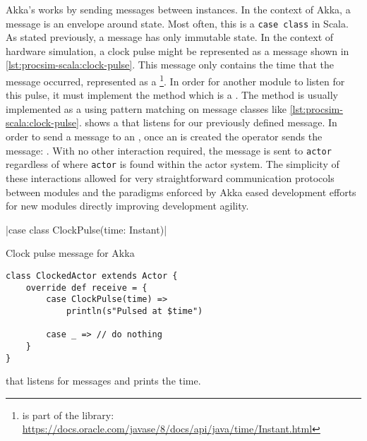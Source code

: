Akka's \akkaActor{} works by sending messages between \akkaActor{} instances. In the context of Akka, a message is an envelope around state. Most often, this is a \texttt{case class} in Scala. As stated previously, a message has only immutable state. In the context of hardware simulation, a clock pulse might be represented as a message shown in \cref{lst:procsim-scala:clock-pulse}. This message only contains the time that the message occurred, represented as a \footnote{ is part of the  library: \url{https://docs.oracle.com/javase/8/docs/api/java/time/Instant.html}{}}. In order for another module to listen for this pulse, it must implement the  method which is a . The  method is usually implemented as a  using pattern matching \cite{Scala-PatternMatching} on message classes like \cref{lst:procsim-scala:clock-pulse}.  shows a \akkaActor{} that listens for our previously defined  message. In order to send a message to an \akkaActor{}, once an \akkaActor{} is created the \scalainline{!} operator sends the message: . With no other interaction required, the message is sent to \texttt{actor} regardless of where \texttt{actor} is found within the actor system. The simplicity of these interactions allowed for very straightforward communication protocols between modules and the paradigms enforced by Akka eased development efforts for new modules directly improving development agility.

\begin{listing}[b!]
    |case class ClockPulse(time: Instant)|
    \caption{Clock pulse message for Akka}
    \label{lst:procsim-scala:clock-pulse}
\end{listing}

\begin{listing}[t!]
\begin{verbatim}
class ClockedActor extends Actor {
    override def receive = {
        case ClockPulse(time) => 
            println(s"Pulsed at $time")
        
        case _ => // do nothing
    }
}
\end{verbatim}
\caption{\akkaActor{} that listens for  messages and prints the time.}
\label{lst:procsim-scala:clock-pulse-actor}
\end{listing}


